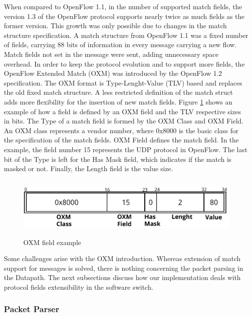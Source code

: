 When compared to OpenFlow 1.1, in the number of supported match fields, the version 1.3 of the OpenFlow protocol supports nearly twice as much fields as the former version. This growth was only possible due to changes in the match structure specification. A match structure from OpenFlow 1.1 was a fixed number of fields, carrying 88 bits of information in every message carrying a new flow. Match fields not set in the message were sent, adding unnecessary space overhead.   
In order to keep the protocol evolution and to support more fields, the OpenFlow Extended Match (OXM) was introduced by the OpenFlow 1.2 specification. The OXM format is Type-Lenght-Value (TLV) based and replaces the old fixed match structure. A less restricted definition of the match struct adds more flexibility for the insertion of new match fields. Figure \ref{fig:oxmfield} shows an example of how a field is defined by an OXM field and the TLV respective sizes in bits. The Type of a match field is formed by the OXM Class and OXM Field. An OXM class represents a vendor number, where 0x8000 is the basic class for the specification of the match fields. OXM Field defines the match field. In the example, the field number 15 represents the UDP protocol in OpenFlow. The last bit of the Type is left for the Has Mask field, which indicates if the match is masked or not. Finally, the Length field is the value size.
\\
\begin{figure}[H]
\centering
\includegraphics[height=3cm,width=\textwidth,keepaspectratio]{eps/OXMfieldexample.pdf}
\caption{OXM field example}
\label{fig:oxmfield}
\end{figure}

Some challenges arise with the OXM introduction. Whereas extension of match support for messages is solved, there is nothing concerning the packet parsing in the Datapath. The next subsections discuss how our implementation deals with protocol fields extensibility in the software switch. 

    \subsubsection{Packet Parser}
    \label{pktparser}

